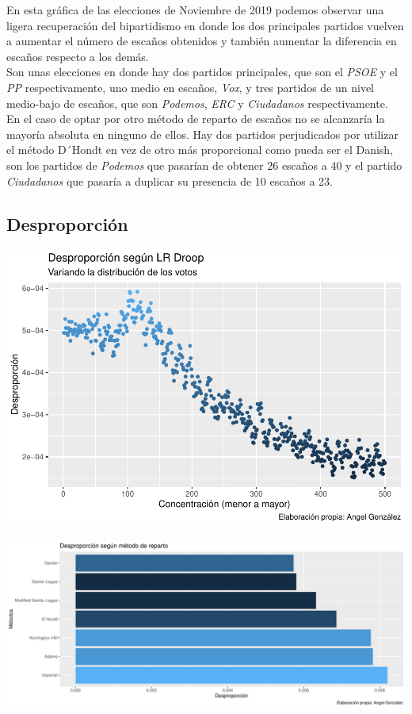 \documentclass[12pt,a4paper,]{book}
\numberwithin{dummy}{section}
\theoremstyle{ocrenumbox}
\theoremstyle{blacknumex}
\theoremstyle{blacknumbox}
\theoremstyle{ocrenum}
\theoremstyle{ocrenum}
\begin{document}
En esta gráfica de las elecciones de Noviembre de 2019 podemos observar
una ligera recuperación del bipartidismo en donde los dos principales
partidos vuelven a aumentar el número de escaños obtenidos y también
aumentar la diferencia en escaños respecto a los demás.\\
Son unas elecciones en donde hay dos partidos principales, que son el
\emph{PSOE} y el \emph{PP} respectivamente, uno medio en escaños,
\emph{Vox}, y tres partidos de un nivel medio-bajo de escaños, que son
\emph{Podemos}, \emph{ERC} y \emph{Ciudadanos} respectivamente.\\
En el caso de optar por otro método de reparto de escaños no se
alcanzaría la mayoría absoluta en ninguno de ellos. Hay dos partidos
perjudicados por utilizar el método D´Hondt en vez de otro más
proporcional como pueda ser el Danish, son los partidos de
\emph{Podemos} que pasarían de obtener 26 escaños a 40 y el partido
\emph{Ciudadanos} que pasaría a duplicar su presencia de 10 escaños a
23.

\hypertarget{desproporciuxf3n-14}{%
\subsection{Desproporción}\label{desproporciuxf3n-14}}

\begin{center}\includegraphics[width=1\linewidth]{figurasR/unnamed-chunk-48-1} \end{center}

\begin{center}\includegraphics[width=1\linewidth]{figurasR/unnamed-chunk-48-2} \end{center}
\end{document}
